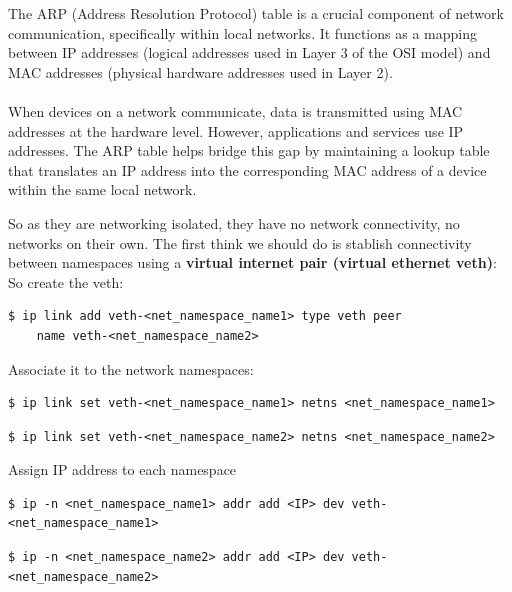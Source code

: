 \documentclass{article}
\newenvironment{blocktemplateII}[1]{%
    \tcolorbox[beamer,%
    noparskip,breakable,
    colframe=Green,%
    colbacklower=LimeGreen!75!LightGreen,%
    title=#1]}%
    {\endtcolorbox}
\newenvironment{codetemplate}[1][]{%
  \mybasecolorbox[#1]
  \itshape
}{%
  \endmybasecolorbox
}
\begin{document}
\begin{blocktemplateII}{NOTE}
The ARP (Address Resolution Protocol) table is a crucial component of network communication, specifically within local networks. It functions as a mapping between IP addresses (logical addresses used in Layer 3 of the OSI model) and MAC addresses (physical hardware addresses used in Layer 2).
\\\\
When devices on a network communicate, data is transmitted using MAC addresses at the hardware level. However, applications and services use IP addresses. The ARP table helps bridge this gap by maintaining a lookup table that translates an IP address into the corresponding MAC address of a device within the same local network.
\end{blocktemplateII}

So as they are networking isolated, they have no network connectivity, no networks on their own. The first think we should do is stablish connectivity between namespaces using a \textbf{virtual internet pair (virtual ethernet veth)}:
So create the veth:
\begin{codetemplate}{}
\begin{verbatim}
$ ip link add veth-<net_namespace_name1> type veth peer 
    name veth-<net_namespace_name2>
\end{verbatim}
\end{codetemplate}

Associate it to the network namespaces:
\begin{codetemplate}{}
\begin{verbatim}
$ ip link set veth-<net_namespace_name1> netns <net_namespace_name1>
\end{verbatim}
\end{codetemplate}
\begin{codetemplate}{}
\begin{verbatim}
$ ip link set veth-<net_namespace_name2> netns <net_namespace_name2>
\end{verbatim}
\end{codetemplate}

Assign IP address to each namespace
\begin{codetemplate}{}
\begin{verbatim}
$ ip -n <net_namespace_name1> addr add <IP> dev veth-<net_namespace_name1>
\end{verbatim}
\end{codetemplate}
\begin{codetemplate}{}
\begin{verbatim}
$ ip -n <net_namespace_name2> addr add <IP> dev veth-<net_namespace_name2>
\end{verbatim}
\end{codetemplate}
\end{document}
